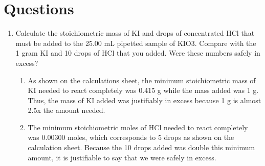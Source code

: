 \documentclass[11pt]{article} %
\begin{document}
\section{Questions}
\begin{enumerate}
	\item Calculate the stoichiometric mass of KI and drops of concentrated HCl that must be added to the 25.00 mL pipetted sample of KIO3. Compare with the 1 gram KI and 10 drops of HCl that you added. Were these numbers safely in excess?
	\begin{enumerate}
		\item As shown on the calculations sheet, the minimum stoichiometric mass of KI needed to react completely was 0.415 g while the mass added was 1 g. Thus, the mass of KI added was justifiably in excess because 1 g is almost 2.5x the amount needed.
		\item The minimum stoichiometric moles of HCl needed to react completely was 0.00300 moles, which corresponds to 5 drops as shown on the calculation sheet. Because the 10 drops added was double this minimum amount, it is justifiable to say that we were safely in excess.
	\end{enumerate}
\end{enumerate}
\end{document}
